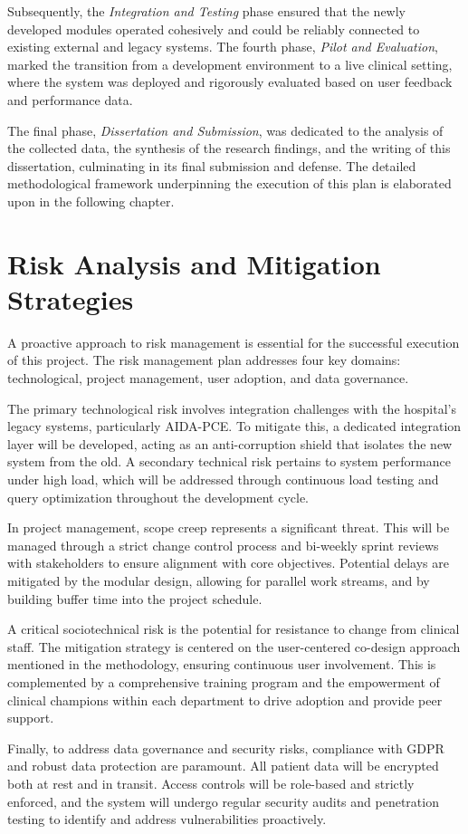 Subsequently, the \textit{Integration and Testing} phase ensured that the newly developed modules operated cohesively and could be reliably connected to existing external and legacy systems. The fourth phase, \textit{Pilot and Evaluation}, marked the transition from a development environment to a live clinical setting, where the system was deployed and rigorously evaluated based on user feedback and performance data.

The final phase, \textit{Dissertation and Submission}, was dedicated to the analysis of the collected data, the synthesis of the research findings, and the writing of this dissertation, culminating in its final submission and defense. The detailed methodological framework underpinning the execution of this plan is elaborated upon in the following chapter.

\section{Risk Analysis and Mitigation Strategies}
\label{sec:RiskAnalysis}

A proactive approach to risk management is essential for the successful execution of this project. The risk management plan addresses four key domains: technological, project management, user adoption, and data governance.

The primary technological risk involves integration challenges with the hospital's legacy systems, particularly AIDA-PCE. To mitigate this, a dedicated integration layer will be developed, acting as an anti-corruption shield that isolates the new system from the old. A secondary technical risk pertains to system performance under high load, which will be addressed through continuous load testing and query optimization throughout the development cycle.

In project management, scope creep represents a significant threat. This will be managed through a strict change control process and bi-weekly sprint reviews with stakeholders to ensure alignment with core objectives. Potential delays are mitigated by the modular design, allowing for parallel work streams, and by building buffer time into the project schedule.

A critical sociotechnical risk is the potential for resistance to change from clinical staff. The mitigation strategy is centered on the user-centered co-design approach mentioned in the methodology, ensuring continuous user involvement. This is complemented by a comprehensive training program and the empowerment of clinical champions within each department to drive adoption and provide peer support.

Finally, to address data governance and security risks, compliance with GDPR and robust data protection are paramount. All patient data will be encrypted both at rest and in transit. Access controls will be role-based and strictly enforced, and the system will undergo regular security audits and penetration testing to identify and address vulnerabilities proactively. 